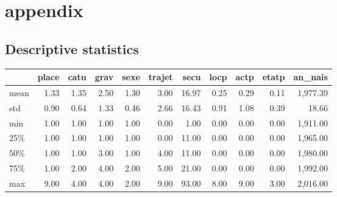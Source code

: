 \documentclass[a4paper]{article}
\theoremstyle{definition}
\theoremstyle{proposition}
\begin{document}
\newpage
\section{appendix}

\subsection{Descriptive statistics} \label{Descriptive statistics}
\begin{tabular}{lrrrrrrrrrr}
\toprule
{} &      place &       catu &       grav &       sexe &     trajet &       secu &       locp &       actp &      etatp &    an\_nais \\
\midrule
mean  &       1.33 &       1.35 &       2.50 &       1.30 &       3.00 &      16.97 &       0.25 &       0.29 &       0.11 &   1,977.39 \\
std   &       0.90 &       0.64 &       1.33 &       0.46 &       2.66 &      16.43 &       0.91 &       1.08 &       0.39 &      18.66 \\
min   &       1.00 &       1.00 &       1.00 &       1.00 &       0.00 &       1.00 &       0.00 &       0.00 &       0.00 &   1,911.00 \\
25\%   &       1.00 &       1.00 &       1.00 &       1.00 &       0.00 &      11.00 &       0.00 &       0.00 &       0.00 &   1,965.00 \\
50\%   &       1.00 &       1.00 &       3.00 &       1.00 &       4.00 &      11.00 &       0.00 &       0.00 &       0.00 &   1,980.00 \\
75\%   &       1.00 &       2.00 &       4.00 &       2.00 &       5.00 &      21.00 &       0.00 &       0.00 &       0.00 &   1,992.00 \\
max   &       9.00 &       4.00 &       4.00 &       2.00 &       9.00 &      93.00 &       8.00 &       9.00 &       3.00 &   2,016.00 \\
\bottomrule
\end{tabular}

\vspace{0.5cm}
\end{document}
